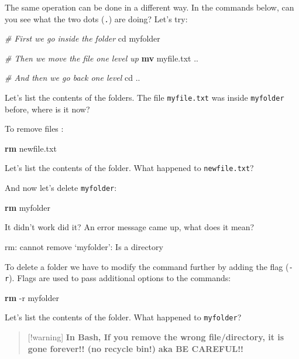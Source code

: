 \documentclass[
]{book}
\newenvironment{Shaded}{\begin{snugshade}}{\end{snugshade}}
\newcommand{\AttributeTok}[1]{\textcolor[rgb]{0.13,0.29,0.53}{#1}}
\newcommand{\BuiltInTok}[1]{#1}
\newcommand{\CommentTok}[1]{\textcolor[rgb]{0.56,0.35,0.01}{\textit{#1}}}
\newcommand{\ExtensionTok}[1]{#1}
\newcommand{\FunctionTok}[1]{\textcolor[rgb]{0.13,0.29,0.53}{\textbf{#1}}}
\newcommand{\NormalTok}[1]{#1}
\begin{document}
The same operation can be done in a different way. In the commands below, can you see what the two dots (\texttt{.}) are doing? Let's try:

\begin{Shaded}
\begin{Highlighting}[]
\CommentTok{\# First we go inside the folder}
\BuiltInTok{cd}\NormalTok{ myfolder}

\CommentTok{\# Then we move the file one level up}
\FunctionTok{mv}\NormalTok{ myfile.txt ..}

\CommentTok{\# And then we go back one level}
\BuiltInTok{cd}\NormalTok{ ..}
\end{Highlighting}
\end{Shaded}

Let's list the contents of the folders. The file \texttt{myfile.txt} was inside \texttt{myfolder} before, where is it now?

To remove files :

\begin{Shaded}
\begin{Highlighting}[]
\FunctionTok{rm}\NormalTok{ newfile.txt}
\end{Highlighting}
\end{Shaded}

Let's list the contents of the folder. What happened to \texttt{newfile.txt}?

And now let's delete \texttt{myfolder}:

\begin{Shaded}
\begin{Highlighting}[]
\FunctionTok{rm}\NormalTok{ myfolder}
\end{Highlighting}
\end{Shaded}

It didn't work did it? An error message came up, what does it mean?

\begin{Shaded}
\begin{Highlighting}[]
\ExtensionTok{rm:}\NormalTok{ cannot remove ‘myfolder’: Is a directory}
\end{Highlighting}
\end{Shaded}

To delete a folder we have to modify the command further by adding the flag (\texttt{-r}). Flags are used to pass additional options to the commands:

\begin{Shaded}
\begin{Highlighting}[]
\FunctionTok{rm} \AttributeTok{{-}r}\NormalTok{ myfolder}
\end{Highlighting}
\end{Shaded}

Let's list the contents of the folder. What happened to \texttt{myfolder}?

\begin{quote}
{[}!warning{]}
\textbf{In Bash, If you remove the wrong file/directory, it is gone forever!! (no recycle bin!)}
\textbf{aka BE CAREFUL!!}
\end{quote}
\end{document}
